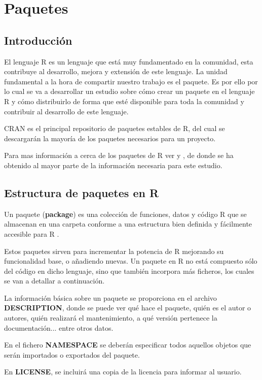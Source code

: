 \section{Paquetes}
\subsection{Introducci\'on}


El lenguaje R es un lenguaje que est\'a muy fundamentado en la comunidad, esta contribuye al desarrollo, mejora y extensi\'on de este lenguaje. La unidad fundamental a la hora de compartir 
nuestro trabajo es el paquete. Es por ello por lo cual se va a desarrollar un estudio sobre c\'omo crear un paquete en el lenguaje R y c\'omo distribuirlo de forma que est\'e disponible para toda la comunidad y contribuir al desarrollo de este lenguaje.

CRAN es el principal repositorio de paquetes estables de R, del cual se descargar\'an la mayor\'ia de los paquetes necesarios para un proyecto.

Para mas informaci\'on a cerca de los paquetes de R ver \cite{rcore} y \cite{book}, de donde se ha obtenido al mayor parte de la informaci\'on necesaria para este estudio.
\subsection{Estructura de paquetes en R}

Un paquete (\textbf{package}) es una colecci\'on de funciones, datos y c\'odigo R que se almacenan en una carpeta 
conforme a una estructura bien definida y f\'acilmente accesible para R \cite{librR}.

Estos paquetes sirven para incrementar la potencia de R mejorando su funcionalidad base, o a\~nadiendo 
nuevas.
Un paquete en R no est\'a compuesto s\'olo del c\'odigo en dicho lenguaje, sino que tambi\'en incorpora m\'as ficheros, 
los cuales se van a detallar a continuaci\'on.\cite{rParaTodos}

La informaci\'on b\'asica sobre un paquete se proporciona en el archivo \textbf{DESCRIPTION}, donde se puede ver qu\'e hace 
el paquete, qui\'en es el autor o autores, qui\'en realizar\'a el mantenimiento, a qu\'e versi\'on pertenece la documentaci\'on... entre otros datos.

En el fichero \textbf{NAMESPACE} se deber\'an especificar todos aquellos objetos que ser\'an importados o exportados del paquete.

En \textbf{LICENSE}, se incluir\'a una copia de la licencia para informar al usuario.

